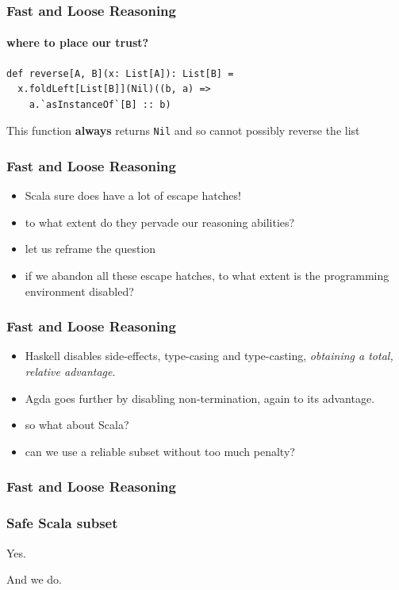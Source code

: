 \begin{frame}[fragile]
\frametitle{Fast and Loose Reasoning}
\framesubtitle{where to place our trust?}
\begin{lstlisting}[style=scala]
def reverse[A, B](x: List[A]): List[B] = 
  x.foldLeft[List[B]](Nil)((b, a) =>
    a.`asInstanceOf`[B] :: b)
\end{lstlisting}
\begin{theorem}This function \textbf{always} returns \lstinline{Nil} and so cannot possibly reverse the list\end{theorem}
\end{frame}

\begin{frame}[fragile]
\frametitle{Fast and Loose Reasoning}
\begin{itemize}
  \item Scala sure does have a lot of escape hatches!
  \item to what extent do they pervade our reasoning abilities?
  \item let us reframe the question
  \item if we abandon all these escape hatches, to what extent is the programming environment disabled?
\end{itemize}
\end{frame}

\begin{frame}[fragile]
\frametitle{Fast and Loose Reasoning}
\begin{itemize}
  \item Haskell disables side-effects, type-casing and type-casting, \emph{obtaining a total, relative advantage}.
  \item Agda goes further by disabling non-termination, again to its advantage.
  \item so what about Scala?
  \item can we use a reliable subset without too much penalty?
\end{itemize}
\end{frame}

\begin{frame}[fragile]
\frametitle{Fast and Loose Reasoning}
\frametitle{Safe Scala subset}
\begin{center}
Yes.
\end{center}
\begin{center}
And we do.
\end{center}
\end{frame}

